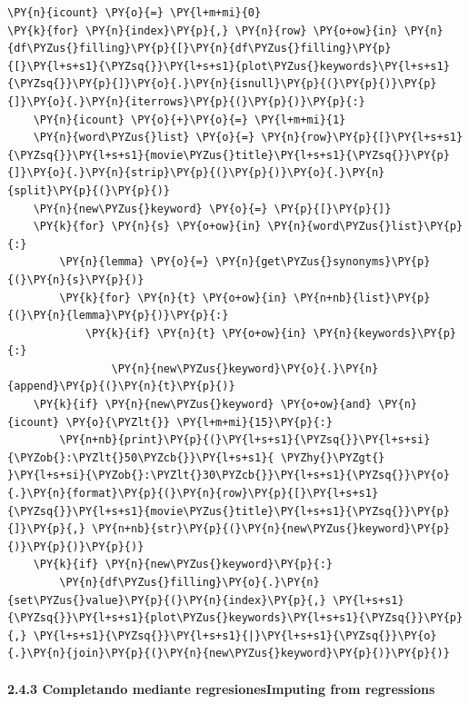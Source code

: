     \begin{tcolorbox}[breakable, size=fbox, boxrule=1pt, pad at break*=1mm,colback=cellbackground, colframe=cellborder]
\begin{Verbatim}[commandchars=\\\{\}]
\PY{n}{icount} \PY{o}{=} \PY{l+m+mi}{0}
\PY{k}{for} \PY{n}{index}\PY{p}{,} \PY{n}{row} \PY{o+ow}{in} \PY{n}{df\PYZus{}filling}\PY{p}{[}\PY{n}{df\PYZus{}filling}\PY{p}{[}\PY{l+s+s1}{\PYZsq{}}\PY{l+s+s1}{plot\PYZus{}keywords}\PY{l+s+s1}{\PYZsq{}}\PY{p}{]}\PY{o}{.}\PY{n}{isnull}\PY{p}{(}\PY{p}{)}\PY{p}{]}\PY{o}{.}\PY{n}{iterrows}\PY{p}{(}\PY{p}{)}\PY{p}{:}
    \PY{n}{icount} \PY{o}{+}\PY{o}{=} \PY{l+m+mi}{1}
    \PY{n}{word\PYZus{}list} \PY{o}{=} \PY{n}{row}\PY{p}{[}\PY{l+s+s1}{\PYZsq{}}\PY{l+s+s1}{movie\PYZus{}title}\PY{l+s+s1}{\PYZsq{}}\PY{p}{]}\PY{o}{.}\PY{n}{strip}\PY{p}{(}\PY{p}{)}\PY{o}{.}\PY{n}{split}\PY{p}{(}\PY{p}{)}
    \PY{n}{new\PYZus{}keyword} \PY{o}{=} \PY{p}{[}\PY{p}{]}
    \PY{k}{for} \PY{n}{s} \PY{o+ow}{in} \PY{n}{word\PYZus{}list}\PY{p}{:}
        \PY{n}{lemma} \PY{o}{=} \PY{n}{get\PYZus{}synonyms}\PY{p}{(}\PY{n}{s}\PY{p}{)}
        \PY{k}{for} \PY{n}{t} \PY{o+ow}{in} \PY{n+nb}{list}\PY{p}{(}\PY{n}{lemma}\PY{p}{)}\PY{p}{:}
            \PY{k}{if} \PY{n}{t} \PY{o+ow}{in} \PY{n}{keywords}\PY{p}{:} 
                \PY{n}{new\PYZus{}keyword}\PY{o}{.}\PY{n}{append}\PY{p}{(}\PY{n}{t}\PY{p}{)}                
    \PY{k}{if} \PY{n}{new\PYZus{}keyword} \PY{o+ow}{and} \PY{n}{icount} \PY{o}{\PYZlt{}} \PY{l+m+mi}{15}\PY{p}{:} 
        \PY{n+nb}{print}\PY{p}{(}\PY{l+s+s1}{\PYZsq{}}\PY{l+s+si}{\PYZob{}:\PYZlt{}50\PYZcb{}}\PY{l+s+s1}{ \PYZhy{}\PYZgt{} }\PY{l+s+si}{\PYZob{}:\PYZlt{}30\PYZcb{}}\PY{l+s+s1}{\PYZsq{}}\PY{o}{.}\PY{n}{format}\PY{p}{(}\PY{n}{row}\PY{p}{[}\PY{l+s+s1}{\PYZsq{}}\PY{l+s+s1}{movie\PYZus{}title}\PY{l+s+s1}{\PYZsq{}}\PY{p}{]}\PY{p}{,} \PY{n+nb}{str}\PY{p}{(}\PY{n}{new\PYZus{}keyword}\PY{p}{)}\PY{p}{)}\PY{p}{)}
    \PY{k}{if} \PY{n}{new\PYZus{}keyword}\PY{p}{:}
        \PY{n}{df\PYZus{}filling}\PY{o}{.}\PY{n}{set\PYZus{}value}\PY{p}{(}\PY{n}{index}\PY{p}{,} \PY{l+s+s1}{\PYZsq{}}\PY{l+s+s1}{plot\PYZus{}keywords}\PY{l+s+s1}{\PYZsq{}}\PY{p}{,} \PY{l+s+s1}{\PYZsq{}}\PY{l+s+s1}{|}\PY{l+s+s1}{\PYZsq{}}\PY{o}{.}\PY{n}{join}\PY{p}{(}\PY{n}{new\PYZus{}keyword}\PY{p}{)}\PY{p}{)} 
\end{Verbatim}
\end{tcolorbox}

    \paragraph{2.4.3 Completando mediante regresionesImputing from
regressions}\label{completando-mediante-regresionesimputing-from-regressions}


